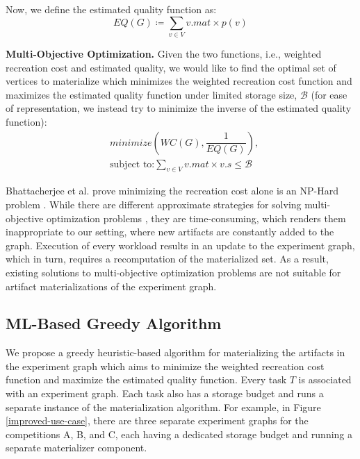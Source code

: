 Now, we define the estimated quality function as:
\[
EQ(G) \coloneqq  \sum\limits_{v \in V}  v.mat \times p(v)
\]

\textbf{Multi-Objective Optimization.}
Given the two functions, i.e., weighted recreation cost and estimated quality, we would like to find the optimal set of vertices to materialize which minimizes the weighted recreation cost function and maximizes the estimated quality function under limited storage size, $\mathcal{B}$ (for ease of representation, we instead try to minimize the inverse of the estimated quality function):
\begin{equation}
\begin{split}
& minimize(WC(G), \dfrac{1}{EQ(G)}), \\
& \text{subject to:} \sum\limits_{v \in V} v.mat \times v.s \leq \mathcal{B}
\end{split}
\end{equation}

Bhattacherjee et al. prove minimizing the recreation cost alone is an NP-Hard problem \cite{bhattacherjee2015principles}.
While there are different approximate strategies for solving multi-objective optimization problems \cite{coello2007evolutionary}, they are time-consuming, which renders them inappropriate to our setting, where new artifacts are constantly added to the graph.
Execution of every workload results in an update to the experiment graph, which in turn, requires a recomputation of the materialized set.
As a result, existing solutions to multi-objective optimization problems are not suitable for artifact materializations of the experiment graph.

\subsection{ML-Based Greedy Algorithm}\label{subsec-ml-based-materialization}
We propose a greedy heuristic-based algorithm for materializing the artifacts in the experiment graph which aims to minimize the weighted recreation cost function and maximize the estimated quality function.
Every task $T$ is associated with an experiment graph.
Each task also has a storage budget and runs a separate instance of the materialization algorithm.
For example, in Figure \ref{improved-use-case}, there are three separate experiment graphs for the competitions A, B, and C, each having a dedicated storage budget and running a separate materializer component.

